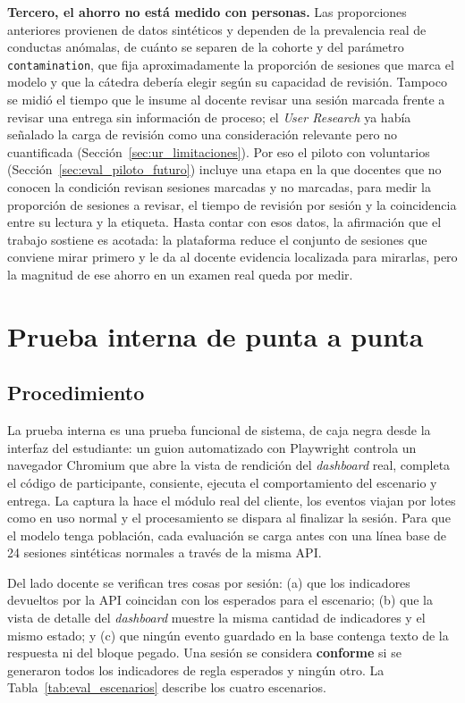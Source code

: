 \textbf{Tercero, el ahorro no está medido con personas.} Las proporciones anteriores provienen de datos sintéticos y dependen de la prevalencia real de conductas anómalas, de cuánto se separen de la cohorte y del parámetro \texttt{contamination}, que fija aproximadamente la proporción de sesiones que marca el modelo y que la cátedra debería elegir según su capacidad de revisión. Tampoco se midió el tiempo que le insume al docente revisar una sesión marcada frente a revisar una entrega sin información de proceso; el \textit{User Research} ya había señalado la carga de revisión como una consideración relevante pero no cuantificada (Sección~\ref{sec:ur_limitaciones}). Por eso el piloto con voluntarios (Sección~\ref{sec:eval_piloto_futuro}) incluye una etapa en la que docentes que no conocen la condición revisan sesiones marcadas y no marcadas, para medir la proporción de sesiones a revisar, el tiempo de revisión por sesión y la coincidencia entre su lectura y la etiqueta. Hasta contar con esos datos, la afirmación que el trabajo sostiene es acotada: la plataforma reduce el conjunto de sesiones que conviene mirar primero y le da al docente evidencia localizada para mirarlas, pero la magnitud de ese ahorro en un examen real queda por medir.

\section{Prueba interna de punta a punta}
\label{sec:eval_prueba_interna}

\subsection{Procedimiento}

La prueba interna es una prueba funcional de sistema, de caja negra desde la interfaz del estudiante: un guion automatizado con Playwright controla un navegador Chromium que abre la vista de rendición del \textit{dashboard} real, completa el código de participante, consiente, ejecuta el comportamiento del escenario y entrega. La captura la hace el módulo real del cliente, los eventos viajan por lotes como en uso normal y el procesamiento se dispara al finalizar la sesión. Para que el modelo tenga población, cada evaluación se carga antes con una línea base de 24 sesiones sintéticas normales a través de la misma API.

Del lado docente se verifican tres cosas por sesión: (a) que los indicadores devueltos por la API coincidan con los esperados para el escenario; (b) que la vista de detalle del \textit{dashboard} muestre la misma cantidad de indicadores y el mismo estado; y (c) que ningún evento guardado en la base contenga texto de la respuesta ni del bloque pegado. Una sesión se considera \textbf{conforme} si se generaron todos los indicadores de regla esperados y ningún otro. La Tabla~\ref{tab:eval_escenarios} describe los cuatro escenarios.

